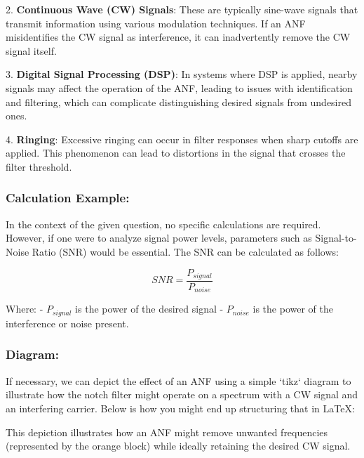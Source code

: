 2. \textbf{Continuous Wave (CW) Signals}: These are typically sine-wave signals that transmit information using various modulation techniques. If an ANF misidentifies the CW signal as interference, it can inadvertently remove the CW signal itself.

3. \textbf{Digital Signal Processing (DSP)}: In systems where DSP is applied, nearby signals may affect the operation of the ANF, leading to issues with identification and filtering, which can complicate distinguishing desired signals from undesired ones.

4. \textbf{Ringing}: Excessive ringing can occur in filter responses when sharp cutoffs are applied. This phenomenon can lead to distortions in the signal that crosses the filter threshold.

\subsubsection*{ Calculation Example:}
In the context of the given question, no specific calculations are required. However, if one were to analyze signal power levels, parameters such as Signal-to-Noise Ratio (SNR) would be essential. The SNR can be calculated as follows:

\[
SNR = \frac{P_{signal}}{P_{noise}}
\]

Where:
- \( P_{signal} \) is the power of the desired signal
- \( P_{noise} \) is the power of the interference or noise present.

\subsubsection*{ Diagram:}
If necessary, we can depict the effect of an ANF using a simple `tikz` diagram to illustrate how the notch filter might operate on a spectrum with a CW signal and an interfering carrier. Below is how you might end up structuring that in LaTeX:

\begin{center}
\end{center}

This depiction illustrates how an ANF might remove unwanted frequencies (represented by the orange block) while ideally retaining the desired CW signal.
